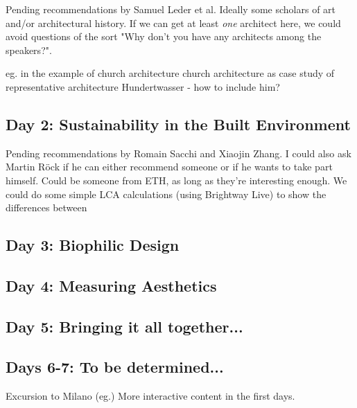 \documentclass{article}
\begin{document}
Pending recommendations by Samuel Leder et al.
Ideally some scholars of art and/or architectural history.
If we can get at least \textit{one} architect here, we could avoid questions of the sort "Why don't you have any architects among the speakers?".

eg. in the example of church architecture
church architecture as case study of representative architecture
Hundertwasser - how to include him?


\subsection{Day 2: Sustainability in the Built Environment}

Pending recommendations by Romain Sacchi and Xiaojin Zhang.
I could also ask Martin Röck if he can either recommend someone or if he wants to take part himself.
Could be someone from ETH, as long as they're interesting enough.
We could do some simple LCA calculations (using Brightway Live) to show the differences between

\subsection{Day 3: Biophilic Design}



\subsection{Day 4: Measuring Aesthetics}

\subsection{Day 5: Bringing it all together...}

\subsection{Days 6-7: To be determined...}

Excursion to Milano (eg.)
More interactive content in the first days.
\end{document}
